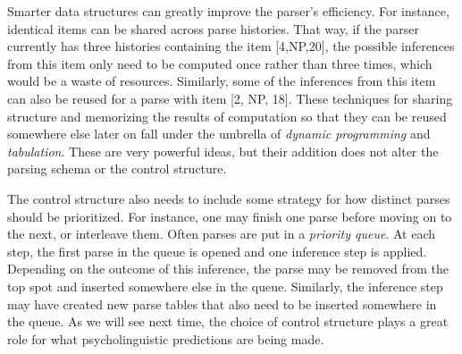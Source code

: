Smarter data structures can greatly improve the parser's efficiency.
For instance, identical items can be shared across parse histories.
That way, if the parser currently has three histories containing the item [4,\psep NP,20], the possible inferences from this item only need to be computed once rather than three times, which would be a waste of resources.
Similarly, some of the inferences from this item can also be reused for a parse with item [2, \psep NP, 18].
These techniques for sharing structure and memorizing the results of computation so that they can be reused somewhere else later on fall under the umbrella of \emph{dynamic programming} and \emph{tabulation}.
These are very powerful ideas, but their addition does not alter the parsing schema or the control structure.

The control structure also needs to include some strategy for how distinct parses should be prioritized.
For instance, one may finish one parse before moving on to the next, or interleave them. 
Often parses are put in a \emph{priority queue}.
At each step, the first parse in the queue is opened and one inference step is applied.
Depending on the outcome of this inference, the parse may be removed from the top spot and inserted somewhere else in the queue.
Similarly, the inference step may have created new parse tables that also need to be inserted somewhere in the queue.
As we will see next time, the choice of control structure plays a great role for what psycholinguistic predictions are being made.





